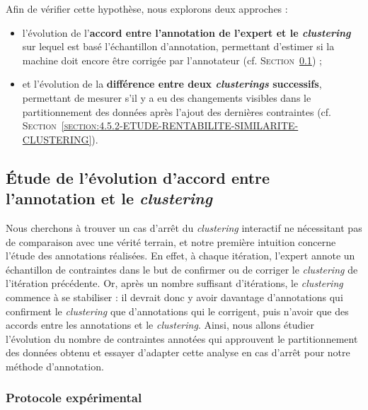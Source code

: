 	Afin de vérifier cette hypothèse, nous explorons deux approches :
	\begin{itemize}
		\item l'évolution de l'\textbf{accord entre l'annotation de l'expert et le \textit{clustering}} sur lequel est basé l'échantillon d'annotation, permettant d'estimer si la machine doit encore être corrigée par l'annotateur  (cf. \textsc{Section~\ref{section:4.5.1-ETUDE-RENTABILITE-ACCORD-ANNOTATION-CLUSTERING}}) ;
		\item et l'évolution de la \textbf{différence entre deux \textit{clusterings} successifs}, permettant de mesurer s'il y a eu des changements visibles dans le partitionnement des données après l'ajout des dernières contraintes (cf. \textsc{Section~\ref{section:4.5.2-ETUDE-RENTABILITE-SIMILARITE-CLUSTERING}}).
	\end{itemize}
	
	
	\subsection{Étude de l'évolution d'accord entre l'annotation et le \textit{clustering}}
	\label{section:4.5.1-ETUDE-RENTABILITE-ACCORD-ANNOTATION-CLUSTERING}
		
		Nous cherchons à trouver un cas d'arrêt du \textit{clustering} interactif ne nécessitant pas de comparaison avec une vérité terrain, et notre première intuition concerne l'étude des annotations réalisées.
		En effet, à chaque itération, l'expert annote un échantillon de contraintes dans le but de confirmer ou de corriger le \textit{clustering} de l'itération précédente.
		Or, après un nombre suffisant d'itérations, le \textit{clustering} commence à se stabiliser : il devrait donc y avoir davantage d'annotations qui confirment le \textit{clustering} que d'annotations qui le corrigent, puis n'avoir que des accords entre les annotations et le \textit{clustering}.
		Ainsi, nous allons étudier l'évolution du nombre de contraintes annotées qui approuvent le partitionnement des données obtenu et essayer d'adapter cette analyse en cas d'arrêt pour notre méthode d'annotation.
	
		\subsubsection{Protocole expérimental}
			
